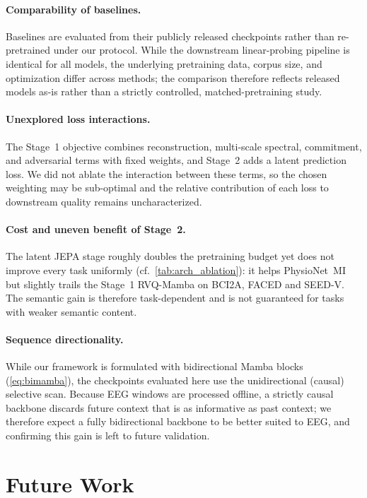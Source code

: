 \documentclass{article}
\begin{document}
\paragraph{Comparability of baselines.}
Baselines are evaluated from their publicly released checkpoints rather than re-pretrained under our protocol.
While the downstream linear-probing pipeline is identical for all models, the underlying pretraining data, corpus size, and optimization differ across methods; the comparison therefore reflects released models as-is rather than a strictly controlled, matched-pretraining study.

\paragraph{Unexplored loss interactions.}
The Stage~1 objective combines reconstruction, multi-scale spectral, commitment, and adversarial terms with fixed weights, and Stage~2 adds a latent prediction loss.
We did not ablate the interaction between these terms, so the chosen weighting may be sub-optimal and the relative contribution of each loss to downstream quality remains uncharacterized.

\paragraph{Cost and uneven benefit of Stage~2.}
The latent JEPA stage roughly doubles the pretraining budget yet does not improve every task uniformly (cf.\ \cref{tab:arch_ablation}): it helps PhysioNet~MI but slightly trails the Stage~1 RVQ-Mamba on BCI2A, FACED and SEED-V.
The semantic gain is therefore task-dependent and is not guaranteed for tasks with weaker semantic content.

\paragraph{Sequence directionality.}
While our framework is formulated with bidirectional Mamba blocks (\cref{eq:bimamba}), the checkpoints evaluated here use the unidirectional (causal) selective scan.
Because EEG windows are processed offline, a strictly causal backbone discards future context that is as informative as past context; we therefore expect a fully bidirectional backbone to be better suited to EEG, and confirming this gain is left to future validation.



\section{Future Work}
\end{document}
